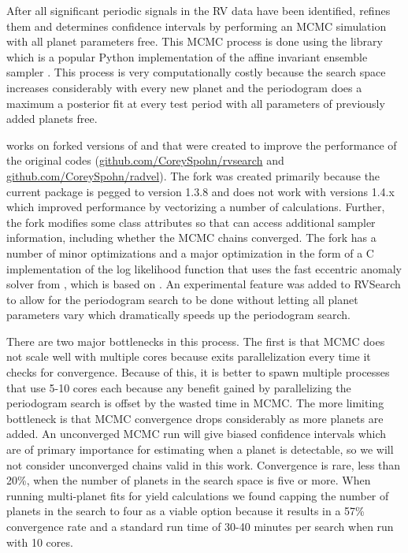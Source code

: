 After all significant periodic signals in the RV data have been identified,
 refines them and determines confidence intervals by performing
an MCMC simulation with all planet parameters free. This MCMC process is done
using the  library \citep{emcee} which is a popular Python
implementation of the affine invariant ensemble sampler \citep{Goodman2010}.
This process is very computationally costly because the search space increases
considerably with every new planet and the periodogram does a maximum a
posterior fit at every test period with all parameters of previously added
planets free.

 works on forked versions of  and
 that were created to improve the performance of the original
codes (\url{github.com/CoreySpohn/rvsearch} and
\url{github.com/CoreySpohn/radvel}). The  fork was created
primarily because the current  package is pegged to
 version 1.3.8 and does not work with  versions 1.4.x
which improved performance by vectorizing a number of calculations. Further,
the fork modifies some class attributes so that  can access
additional sampler information, including whether the MCMC chains converged.
The  fork has a number of minor optimizations and a major
optimization in the form of a C implementation of the log likelihood function
that uses the fast eccentric anomaly solver from 
\citep{brandtOrvaraEfficient2021}, which is based on
\citet{raposo-pulidoEfficientCode2017}. An experimental feature was added to
RVSearch to allow for the periodogram search to be done without letting all
planet parameters vary which dramatically speeds up the periodogram search.

There are two major bottlenecks in this process. The first is that MCMC does
not scale well with multiple cores because  exits parallelization
every time it checks for convergence. Because of this, it is better to spawn
multiple processes that use 5-10 cores each because any benefit gained by
parallelizing the periodogram search is offset by the wasted time in MCMC. The
more limiting bottleneck is that MCMC convergence drops considerably as more
planets are added. An unconverged MCMC run will give biased confidence
intervals which are of primary importance for estimating when a planet is
detectable, so we will not consider unconverged chains valid in this work.
Convergence is rare, less than 20\%, when the number of planets in the search
space is five or more. When running multi-planet fits for yield calculations we
found capping the number of planets in the search to four as a viable option
because it results in a 57\% convergence rate and a standard run time of 30-40
minutes per search when run with 10 cores.

